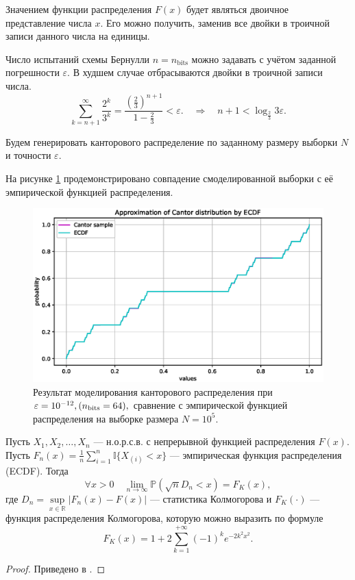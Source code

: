 \documentclass[11pt]{report}
\begin{document}
Значением функции распределения $F(x)$ будет являться двоичное представление числа $x$. Его можно получить, заменив все двойки в троичной записи данного числа на единицы.

Число испытаний схемы Бернулли $n=n_{\operatorname{bits}}$ можно задавать с учётом заданной погрешности $\varepsilon$. В худшем случае отбрасываются двойки в троичной записи числа.
$$
\sum_{k=n+1}^{\infty} \dfrac{2^{k}}{3^{k}} = \dfrac{(\frac{2}{3})^{n+1}}{1 - \frac{2}{3}} < \varepsilon.
\quad\Rightarrow\quad
n + 1 < \log_{\frac{2}{3}}3\varepsilon.
$$

Будем генерировать канторового распределение по заданному размеру выборки $N$ и точности $\varepsilon$.

На рисунке \ref{fig:kantor-ecdf} продемонстрировано совпадение смоделированной выборки с её эмпирической функцией распределения.

\begin{figure}[H]
    \centering
    \includegraphics[width=0.9\linewidth]{kantor-ecdf.eps}
    \caption{Результат моделирования канторового распределения при $\varepsilon =10^{-12}, (n_{\operatorname{bits}}=64),$ сравнение с эмпирической функцией распределения на выборке размера $N=10^5$.}
    \label{fig:kantor-ecdf}
\end{figure}

\begin{theorem}[Колмогоров] Пусть $X_1,X_2,\dots,X_n$ — н.о.р.с.в. с непрерывной функцией распределения $F(x)$.
Пусть $F_n(x) = \frac{1}{n}\sum_{i=1}^n \mathbb{I}\{X_{(i)}<x\}$ — эмпирическая функция распределения (ECDF).
Тогда 
$$
\forall x>0\quad \lim_{n\to\infty} \mathbb{P}({\sqrt{n}D_n < x}) = F_K(x),
$$
где $D_n=\sup\limits_{x\in\mathbb{R}}|F_n(x)-F(x)|$ — статистика Колмогорова и $F_K(\cdot)$ — функция распределения Колмогорова, которую можно выразить по формуле
$$
F_K(x) = 1 + 2 \sum_{k=1}^{+\infty}(-1)^k e^{-2k^2x^2}.
$$
\end{theorem}
\begin{proof} Приведено в \cite{shiryaev-1}. \end{proof}
\end{document}
